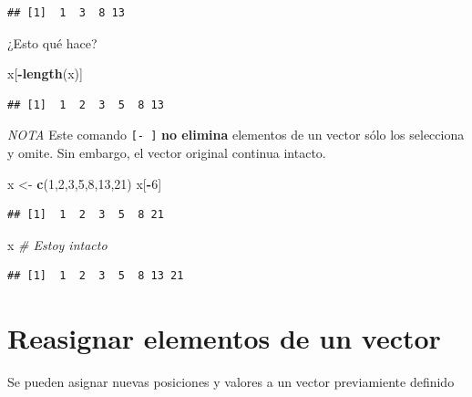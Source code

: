 \documentclass[
]{book}
\newenvironment{Shaded}{\begin{snugshade}}{\end{snugshade}}
\newcommand{\CommentTok}[1]{\textcolor[rgb]{0.56,0.35,0.01}{\textit{#1}}}
\newcommand{\DecValTok}[1]{\textcolor[rgb]{0.00,0.00,0.81}{#1}}
\newcommand{\FunctionTok}[1]{\textcolor[rgb]{0.13,0.29,0.53}{\textbf{#1}}}
\newcommand{\NormalTok}[1]{#1}
\newcommand{\OtherTok}[1]{\textcolor[rgb]{0.56,0.35,0.01}{#1}}
\newcommand{\SpecialCharTok}[1]{\textcolor[rgb]{0.81,0.36,0.00}{\textbf{#1}}}
\begin{document}
\begin{verbatim}
## [1]  1  3  8 13
\end{verbatim}

¿Esto qué hace?

\begin{Shaded}
\begin{Highlighting}[]
\NormalTok{x[}\SpecialCharTok{{-}}\FunctionTok{length}\NormalTok{(x)]}
\end{Highlighting}
\end{Shaded}

\begin{verbatim}
## [1]  1  2  3  5  8 13
\end{verbatim}

\emph{NOTA} Este comando \texttt{{[}-\ {]}} \textbf{no elimina} elementos de un vector sólo los selecciona y omite. Sin embargo, el vector original continua intacto.

\begin{Shaded}
\begin{Highlighting}[]
\NormalTok{x }\OtherTok{\textless{}{-}} \FunctionTok{c}\NormalTok{(}\DecValTok{1}\NormalTok{,}\DecValTok{2}\NormalTok{,}\DecValTok{3}\NormalTok{,}\DecValTok{5}\NormalTok{,}\DecValTok{8}\NormalTok{,}\DecValTok{13}\NormalTok{,}\DecValTok{21}\NormalTok{)}
\NormalTok{x[}\SpecialCharTok{{-}}\DecValTok{6}\NormalTok{] }
\end{Highlighting}
\end{Shaded}

\begin{verbatim}
## [1]  1  2  3  5  8 21
\end{verbatim}

\begin{Shaded}
\begin{Highlighting}[]
\NormalTok{x     }\CommentTok{\# Estoy intacto}
\end{Highlighting}
\end{Shaded}

\begin{verbatim}
## [1]  1  2  3  5  8 13 21
\end{verbatim}

\section{Reasignar elementos de un vector}\label{reasignar-elementos-de-un-vector}

Se pueden asignar nuevas posiciones y valores a un vector previamiente definido
\end{document}
